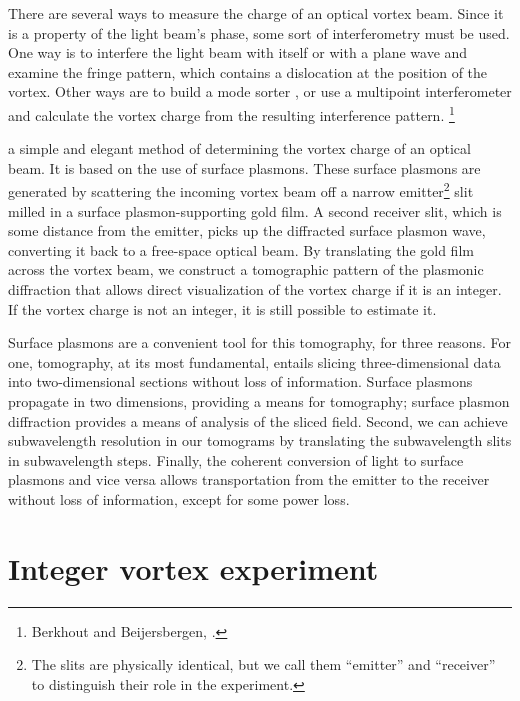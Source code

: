 There are several ways to measure the charge of an optical vortex beam. Since it is a property of the light beam's phase, some sort of interferometry must be used. One way is to interfere the light beam with itself  or with a plane wave \cite{Padgett1996} and examine the fringe pattern, which contains a dislocation at the position of the vortex. Other ways are to build a mode sorter \cite{Mair2001,Leach2002}, or use a multipoint interferometer and calculate the vortex charge from the resulting interference pattern.%
\footnote{Berkhout and Beij\-ers\-berg\-en, \citeyear{Berkhout2009}.}

 a simple and elegant method of determining the vortex charge of an optical beam. It is based on the use of surface plasmons. These surface plasmons are generated by scattering the incoming vortex beam off a narrow emitter\footnote{The slits are physically identical, but we call them ``emitter'' and ``receiver'' to distinguish their role in the experiment.} slit milled in a surface plasmon-supporting gold film. A second receiver slit, which is some distance from the emitter, picks up the diffracted surface plasmon wave, converting it back to a free-space optical beam. By translating the gold film across the vortex beam, we construct a tomographic pattern of the plasmonic diffraction that allows direct visualization of the vortex charge if it is an integer.
If the vortex charge is not an integer, it is still possible to estimate it.

Surface plasmons are a convenient tool for this tomography, for three reasons. For one, tomography, at its most fundamental, entails slicing three-dimensional data into two-dimensional sections without loss of information. Surface plasmons propagate in two dimensions, providing a means for tomography; surface plasmon diffraction provides a means of analysis of the sliced field. Second, we can achieve subwavelength resolution in our tomograms by translating the subwavelength slits in subwavelength steps. Finally, the coherent conversion of light to surface plasmons and vice versa allows transportation from the emitter to the receiver without loss of information, except for some power loss.

\section{Integer vortex experiment}


